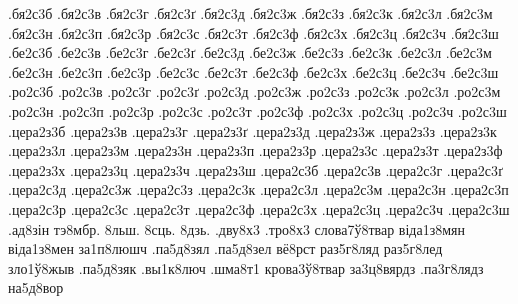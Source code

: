 {.бя2с3б
.бя2с3в
.бя2с3г
.бя2с3ґ
.бя2с3д
.бя2с3ж
.бя2с3з
.бя2с3к
.бя2с3л
.бя2с3м
.бя2с3н
.бя2с3п
.бя2с3р
.бя2с3с
.бя2с3т
.бя2с3ф
.бя2с3х
.бя2с3ц
.бя2с3ч
.бя2с3ш
.бе2с3б
.бе2с3в
.бе2с3г
.бе2с3ґ
.бе2с3д
.бе2с3ж
.бе2с3з
.бе2с3к
.бе2с3л
.бе2с3м
.бе2с3н
.бе2с3п
.бе2с3р
.бе2с3с
.бе2с3т
.бе2с3ф
.бе2с3х
.бе2с3ц
.бе2с3ч
.бе2с3ш
.ро2с3б
.ро2с3в
.ро2с3г
.ро2с3ґ
.ро2с3д
.ро2с3ж
.ро2с3з
.ро2с3к
.ро2с3л
.ро2с3м
.ро2с3н
.ро2с3п
.ро2с3р
.ро2с3с
.ро2с3т
.ро2с3ф
.ро2с3х
.ро2с3ц
.ро2с3ч
.ро2с3ш
.цера2з3б
.цера2з3в
.цера2з3г
.цера2з3ґ
.цера2з3д
.цера2з3ж
.цера2з3з
.цера2з3к
.цера2з3л
.цера2з3м
.цера2з3н
.цера2з3п
.цера2з3р
.цера2з3с
.цера2з3т
.цера2з3ф
.цера2з3х
.цера2з3ц
.цера2з3ч
.цера2з3ш
.цера2с3б
.цера2с3в
.цера2с3г
.цера2с3ґ
.цера2с3д
.цера2с3ж
.цера2с3з
.цера2с3к
.цера2с3л
.цера2с3м
.цера2с3н
.цера2с3п
.цера2с3р
.цера2с3с
.цера2с3т
.цера2с3ф
.цера2с3х
.цера2с3ц
.цера2с3ч
.цера2с3ш
.ад8зін
тэ8мбр.
8льш.
8сць.
8дзь.
.дву8х3
.тро8х3
слова7ў8твар
віда1з8мян
віда1з8мен
за1п8люшч
.па5д8зял
.па5д8зел
вё8рст
раз5г8ляд
раз5г8лед
зло1ў8жыв
.па5д8зяк
.вы1к8люч
.шма8т1
крова3ў8твар
за3ц8вярдз
.па3г8лядз
на5д8вор
}

